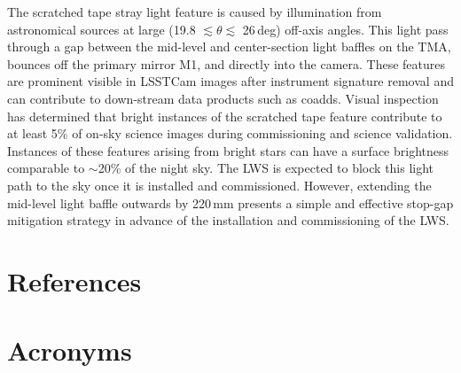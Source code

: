 \documentclass[SE,lsstdraft,authoryear,toc]{lsstdoc}
\begin{document}
The scratched tape stray light feature is caused by illumination from astronomical sources at large (19.8 $\lesssim \theta \lesssim$ 26\,deg) off-axis angles. This light pass through a gap between the mid-level and center-section light baffles on the TMA, bounces off the primary mirror M1, and directly into the camera. These features are prominent visible in LSSTCam images after instrument signature removal and can contribute to down-stream data products such as coadds. Visual inspection has determined that bright instances of the scratched tape feature contribute to at least 5\% of on-sky science images during commissioning and science validation. Instances of these features arising from bright stars can have a surface brightness comparable to $\sim$20\% of the night sky. The LWS is expected to block this light path to the sky once it is installed and commissioned. However, extending the mid-level light baffle outwards by 220\,mm presents a simple and effective stop-gap mitigation strategy in advance of the installation and commissioning of the LWS.

\appendix
\section{References} \label{sec:bib}
\renewcommand{\refname}{} %


\section{Acronyms} \label{sec:acronyms}

\end{document}
